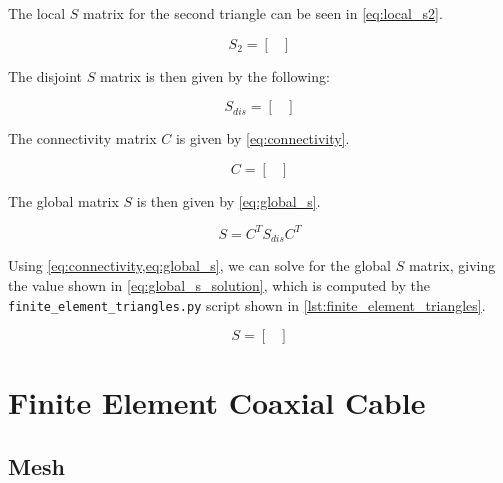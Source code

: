 \documentclass[a4paper,titlepage]{article}
\begin{document}
	The local $S$ matrix for the second triangle can be seen in \cref{eq:local_s2}.
	
	\begin{equation} \label{eq:local_s2}
		S_2 =
			\begin{bmatrix}
				
			\end{bmatrix}
	\end{equation}
	
	The disjoint $S$ matrix is then given by the following:

	\begin{equation*}
		S_{dis} =
			\begin{bmatrix}
				
			\end{bmatrix}
	\end{equation*}
	
	The connectivity matrix $C$ is given by \cref{eq:connectivity}.

	\begin{equation} \label{eq:connectivity}
		C =
			\begin{bmatrix}
				
			\end{bmatrix}
	\end{equation}
	
	The global matrix $S$ is then given by \cref{eq:global_s}.
	
	\begin{equation} \label{eq:global_s}
		S = C^T S_{dis} C^T
	\end{equation}
	
	Using \cref{eq:connectivity,eq:global_s}, we can solve for the global $S$ matrix, giving the value shown in \cref{eq:global_s_solution}, which is computed by the \texttt{finite_element_triangles.py} script shown in \cref{lst:finite_element_triangles}.
	
	\begin{equation} \label{eq:global_s_solution}
		S =
			\begin{bmatrix}
				
			\end{bmatrix}
	\end{equation}
	
	\section{Finite Element Coaxial Cable}
	
	\subsection{Mesh}
	
\end{document}
